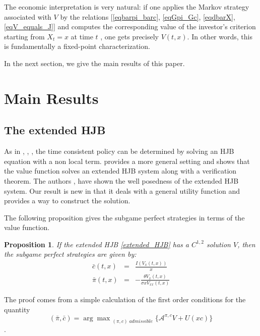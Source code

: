 \documentclass[11pt, psfig]{article}
\newtheorem{proposition}[theorem]{Proposition}
\theoremstyle{definition}
\theoremstyle{remark}
\numberwithin{equation}{section}
\begin{document}
The economic interpretation is very natural: if one applies the Markov
strategy associated with $V$ by the relations [\eqref{eqbarpi_barc}, \eqref{eqGpi_Gc}, \eqref{eqdbarX}, \eqref{eqV_equals_J}] and computes the
corresponding value of the investor's criterion starting from $ X_t=x$ at time $t$%
, one gets precisely $V\left( t,x\right) $. In other words, this is
fundamentally a fixed-point characterization. 

In the next section, we give the main results of this paper.
\section{Main Results}

\subsection{The extended HJB}
As in \cite{Ek_Pi1}, \cite{Ek_Mb_Pi1}, \cite{Mb_Pi1}, the time consistent policy can be determined by solving an HJB equation with a non local term.
\cite{Bj_Kh_Mu1} provides a more general setting and shows that the value function solves an extended HJB system along with a verification theorem. The authors \cite{Le_Pu1}, \cite{Le_Pu2} have shown the well posedness of the extended HJB system. Our result is new in that it deals with a general utility function and provides a way to construct the solution.

The following proposition gives the subgame perfect strategies in terms of the value function.
\begin{proposition}\label{policies_TC}
If the extended HJB \eqref{extended_HJB} has a $C^{1,2}$ solution $V$, then
the subgame perfect  strategies are given by:
\begin{eqnarray}
\bar{c}(t,x)&=&\frac{I(V_x(t,x))}{x}\\ \label{eq151_2}
\bar{\pi}(t,x)&=&-\frac{\theta V_x(t,x) }{\sigma x V_{xx}(t,x)} \label{eq151_3}
\end{eqnarray}

\end{proposition}

The proof comes from a simple calculation of the first order conditions for the quantity $$(\bar{\pi},\bar{c})= {\arg\max}_{(\pi,c) \;admissible} \; \{\mathcal{A}^{\pi,c}V+U(xc) \}$$. 
\end{document}
